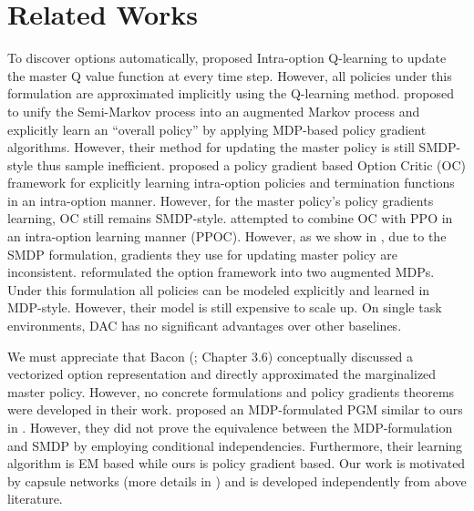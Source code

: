 \section{Related Works}
\label{sec:review}

To discover options automatically, 
proposed Intra-option Q-learning to update the master Q value
function at every time step. However, all policies under this
formulation are approximated implicitly using the Q-learning
method.  proposed to unify the
Semi-Markov process into an augmented Markov process and
explicitly learn an ``overall policy'' by applying MDP-based
policy gradient algorithms. However, their method for updating
the master policy is still SMDP-style thus sample inefficient.
 proposed a policy gradient based
Option Critic (OC) framework for explicitly learning intra-option
policies and termination functions in an intra-option manner.
However, for the master policy's policy gradients learning, OC
still remains SMDP-style. 
attempted to combine OC with PPO in an intra-option learning
manner (PPOC). However, as we show in
, due to the SMDP formulation,
gradients they use for updating master policy are inconsistent.
 reformulated the option framework into
two augmented MDPs. Under this formulation all policies can be
modeled explicitly and learned in MDP-style. However, their model
is still expensive to scale up. On single task environments, DAC
has no significant advantages over other baselines.

We must appreciate that Bacon (\cite{bacon2018temporal}; Chapter
3.6) conceptually discussed a vectorized option representation
and directly approximated the marginalized master policy.
However, no concrete formulations and policy gradients theorems
were developed in their work. 
proposed an MDP-formulated PGM similar to ours in
. However, they did not prove the
equivalence between the MDP-formulation and SMDP by employing
conditional independencies. Furthermore, their learning algorithm
is EM based while ours is policy gradient based. Our work is
motivated by capsule networks 
(more details in ) and is developed
independently from above literature.

